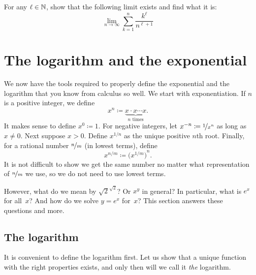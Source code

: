 \begin{exercise}
For any $\ell \in {\mathbb{N}}$,
show that the following limit exists and find what it is:
\begin{equation*}
\lim_{n\to\infty} \sum_{k=1}^n \frac{k^\ell}{n^{\ell+1}}
\end{equation*}
\end{exercise}


\sectionnewpage
\section{The logarithm and the exponential}
\label{sec:logandexp}



We now have the tools required to properly define the exponential
and the
logarithm that you know from calculus so well.  We start with
exponentiation.
If $n$ is a positive integer, we define
\begin{equation*}
x^n \coloneqq \underbrace{x \cdot x \cdots x}_{n \text{ times}} .
\end{equation*}
It makes sense to define $x^0 \coloneqq 1$.
For negative integers, let $x^{-n} \coloneqq \nicefrac{1}{x^n}$ as long as
$x \neq 0$.
Next suppose $x > 0$.
Define
$x^{1/n}$ as
the unique positive $n$th root.  Finally, for a rational
number $\nicefrac{n}{m}$ (in lowest terms), define
\begin{equation*}
x^{n/m} \coloneqq {\bigl(x^{1/m}\bigr)}^n .
\end{equation*}
It is not difficult to show 
we get the same number no matter what
representation of $\nicefrac{n}{m}$ we use, so we do not need to use
lowest terms.

However, what do we mean by $\sqrt{2}^{\sqrt{2}}$?  Or
$x^y$ in general?  In particular, what is $e^x$ for all~$x$?
And how do we solve $y=e^x$ for~$x$?
This section answers these questions and more.

\subsection{The logarithm}

It is convenient to define the logarithm first.
Let us show that
a unique function with the right properties exists, and only then will
we call it \emph{the} logarithm.

